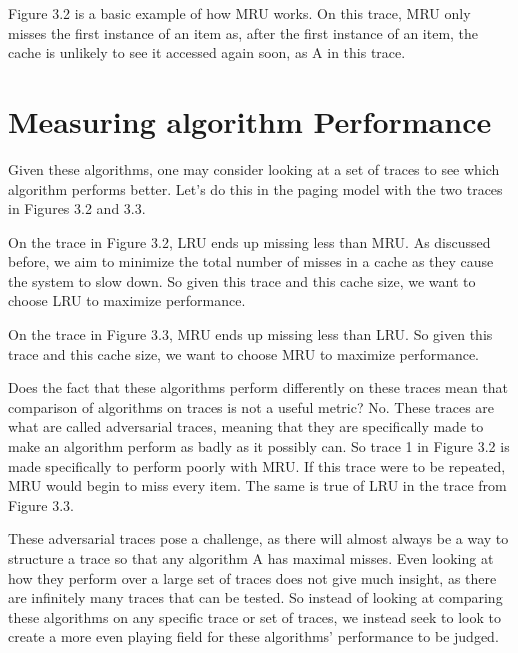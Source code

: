 Figure 3.2 is a basic example of how MRU works. On this trace, MRU only misses the first instance of an item as, after the first instance of an item, the cache is unlikely to see it accessed again soon, as A in this trace. 



\section{Measuring algorithm Performance}
Given these algorithms, one may consider looking at a set of traces to see which algorithm performs better. Let's do this in the paging model with the two traces in Figures 3.2 and 3.3.

On the trace in Figure 3.2, LRU ends up missing less than MRU. As discussed before, we aim to minimize the total number of misses in a cache as they cause the system to slow down. So given this trace and this cache size, we want to choose LRU to maximize performance.

On the trace in Figure 3.3, MRU ends up missing less than LRU. So given this trace and this cache size, we want to choose MRU to maximize performance.


\hfill \break
\hfill \break
\hfill \break
\hfill \break
\hfill \break
\hfill \break
\hfill \break
\hfill \break



Does the fact that these algorithms perform differently on these traces mean that comparison of algorithms on traces is not a useful metric? No. These traces are what are called adversarial traces, meaning that they are specifically made to make an algorithm perform as badly as it possibly can. So trace 1 in Figure 3.2 is made specifically to perform poorly with MRU. If this trace were to be repeated, MRU would begin to miss every item. The same is true of LRU in the trace from Figure 3.3.

These adversarial traces pose a challenge, as there will almost always be a way to structure a trace so that any algorithm A has maximal misses. Even looking at how they perform over a large set of traces does not give much insight, as there are infinitely many traces that can be tested. So instead of looking at comparing these algorithms on any specific trace or set of traces, we instead seek to look to create a more even playing field for these algorithms' performance to be judged.
\hfill \break
\hfill \break
\hfill \break
\hfill \break
\hfill \break


